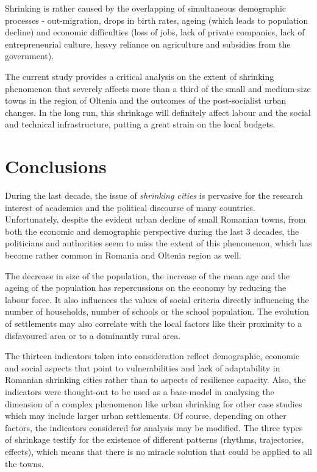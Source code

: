 Shrinking is rather caused by the overlapping of simultaneous demographic processes - out-migration, drops in birth rates, ageing (which leads to population decline) and economic difficulties (loss of jobs, lack of private companies, lack of entrepreneurial culture, heavy reliance on agriculture and subsidies from the government).

The current study provides a critical analysis on the extent of shrinking phenomenon that severely affects more than a third of the small and medium-size towns in the region of Oltenia and the outcomes of the post-socialist urban changes. In the long run, this shrinkage will definitely affect labour and the social and technical infrastructure, putting a great strain on the local budgets.

\section{Conclusions}

During the last decade, the issue of \textit{shrinking cities} is pervasive for the research interest of academics and the political discourse of many countries. Unfortunately, despite the evident urban decline of small Romanian towns, from both the economic and demographic perspective during the last 3 decades, the politicians and authorities seem to miss the extent of this phenomenon, which has become rather common in Romania and Oltenia region as well.

The decrease in size of the population, the increase of the mean age and the ageing of the population has repercussions on the economy by reducing the labour force. It also influences the values of social criteria directly influencing the number of households, number of schools or the school population. The evolution of settlements may also correlate with the local factors like their proximity to a disfavoured area or to a dominantly rural area.

The thirteen indicators taken into consideration reflect demographic, economic and social aspects that point to vulnerabilities and lack of adaptability in Romanian shrinking cities \citep{banica_challenges_2017} rather than to aspects of resilience capacity. Also, the indicators were thought-out to be used as a base-model in analysing the dimension of a complex phenomenon like urban shrinking for other case studies which may include larger urban settlements. Of course, depending on other factors, the indicators considered for analysis may be modified. The three types of shrinkage testify for the existence of different patterns (rhythms, trajectories, effects), which means that there is no miracle solution that could be applied to all the towns.

